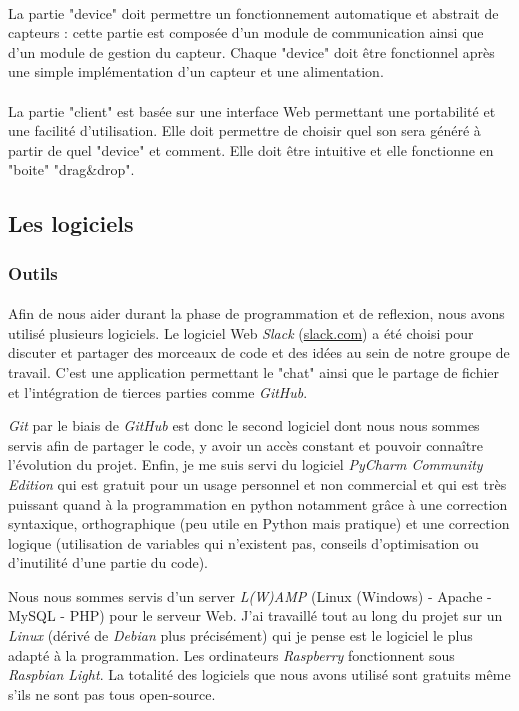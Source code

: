 \documentclass[12pt]{article}
\begin{document}
	\paragraph{}
	La partie "device" doit permettre un fonctionnement automatique et abstrait de capteurs : cette partie est composée d'un module de communication ainsi que d'un module de gestion du capteur. Chaque "device" doit être fonctionnel après une simple implémentation d'un capteur et une alimentation.
	\paragraph{}
	La partie "client" est basée sur une interface Web permettant une portabilité et une facilité d'utilisation. Elle doit permettre de choisir quel son sera généré à partir de quel "device" et comment. Elle doit être intuitive et elle fonctionne en "boite" "drag\&drop".
	\subsection{Les logiciels}
	\subsubsection{Outils}
	\paragraph{}
	Afin de nous aider durant la phase de programmation et de reflexion, nous avons utilisé plusieurs logiciels. Le logiciel Web \textit{Slack} (\url{slack.com}) a été choisi pour discuter et partager des morceaux de code et des idées au sein de notre groupe de travail. C'est une application permettant le "chat" ainsi que le partage de fichier et l'intégration de tierces parties comme \textit{GitHub}.
	
	\textit{Git} par le biais de \textit{GitHub} est donc le second logiciel dont nous nous sommes servis afin de partager le code, y avoir un accès constant et pouvoir connaître l'évolution du projet. Enfin, je me suis servi du logiciel \textit{PyCharm Community Edition} qui est gratuit pour un usage personnel et non commercial et qui est très puissant quand à la programmation en python notamment grâce à une correction syntaxique, orthographique (peu utile en Python mais pratique) et une correction logique (utilisation de variables qui n'existent pas, conseils d'optimisation ou d'inutilité d'une partie du code).
	
	Nous nous sommes servis d'un server \textit{L(W)AMP} (Linux (Windows) - Apache - MySQL - PHP) pour le serveur Web. J'ai travaillé tout au long du projet sur un \textit{Linux} (dérivé de \textit{Debian} plus précisément) qui je pense est le logiciel le plus adapté à la programmation. Les ordinateurs \textit{Raspberry} fonctionnent sous \textit{Raspbian Light}. La totalité des logiciels que nous avons utilisé sont gratuits même s'ils ne sont pas tous open-source.
\end{document}
